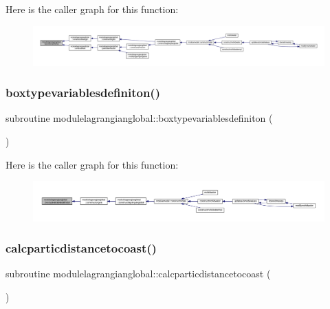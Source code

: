 Here is the caller graph for this function\+:\nopagebreak
\begin{figure}[H]
\begin{center}
\leavevmode
\includegraphics[width=350pt]{namespacemodulelagrangianglobal_a88f19e8e5a4b9ce0cfe45715a5e96dbc_icgraph}
\end{center}
\end{figure}
\mbox{\label{namespacemodulelagrangianglobal_af59eca67cb4a5c0dd0d805d6a08538ba}} 
\subsubsection{\texorpdfstring{boxtypevariablesdefiniton()}{boxtypevariablesdefiniton()}}
{\footnotesize\ttfamily subroutine modulelagrangianglobal\+::boxtypevariablesdefiniton (\begin{DoxyParamCaption}{ }\end{DoxyParamCaption})\hspace{0.3cm}{\ttfamily [private]}}

Here is the caller graph for this function\+:\nopagebreak
\begin{figure}[H]
\begin{center}
\leavevmode
\includegraphics[width=350pt]{namespacemodulelagrangianglobal_af59eca67cb4a5c0dd0d805d6a08538ba_icgraph}
\end{center}
\end{figure}
\mbox{\label{namespacemodulelagrangianglobal_a93a1f184ec51e9c61c7ac05ecf8d9364}} 
\subsubsection{\texorpdfstring{calcparticdistancetocoast()}{calcparticdistancetocoast()}}
{\footnotesize\ttfamily subroutine modulelagrangianglobal\+::calcparticdistancetocoast (\begin{DoxyParamCaption}{ }\end{DoxyParamCaption})\hspace{0.3cm}{\ttfamily [private]}}

